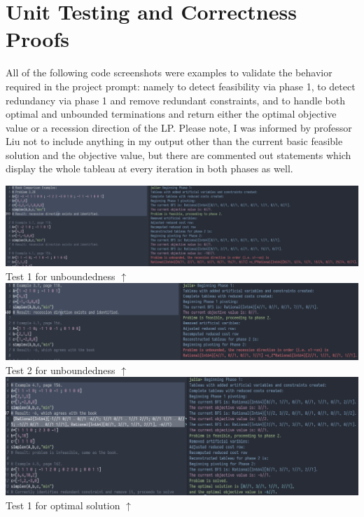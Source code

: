 \documentclass[11pt]{article}
\begin{document}
\section{Unit Testing and Correctness Proofs}
\label{sec:org829ea81}
All of the following code screenshots were examples to validate the behavior required in the project prompt: namely to detect feasibility via phase 1, to detect redundancy via phase 1 and remove redundant constraints, and to handle both optimal and unbounded terminations and return either the optimal objective value or a recession direction of the LP. Please note, I was informed by professor Liu not to include anything in my output other than the current basic feasible solution and the objective value, but there are commented out statements which display the whole tableau at every iteration in both phases as well.
\begin{center}
\includegraphics[width=1\textwidth]{figure1.png}\\
Test 1 for unboundedness $\uparrow$\\

\includegraphics[width=\textwidth]{figure2.png}\\
Test 2 for unboundedness $\uparrow$\\

\includegraphics[width=\textwidth]{figure3.png}\\
Test 1 for optimal solution $\uparrow$\\


\end{center}
\end{document}
